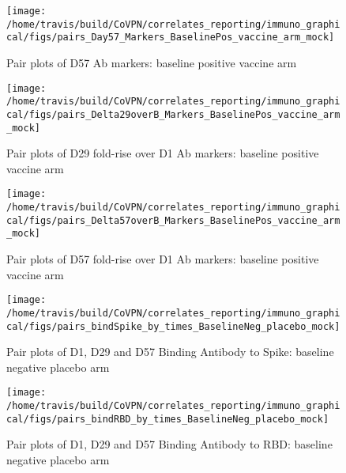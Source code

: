 \documentclass[]{book}
\theoremstyle{definition}
\theoremstyle{definition}
\theoremstyle{definition}
\newcommand{\1}{\mathbbm{1}}
\begin{document}
\clearpage
\begin{figure}[H]

{\centering \texttt{[image: /home/travis/build/CoVPN/correlates\_reporting/immuno\_graphical/figs/pairs\_Day57\_Markers\_BaselinePos\_vaccine\_arm\_mock]} 

}

\caption{Pair plots of D57 Ab markers: baseline positive vaccine arm}\label{fig:unnamed-chunk-14}
\end{figure}

\clearpage
\begin{figure}[H]

{\centering \texttt{[image: /home/travis/build/CoVPN/correlates\_reporting/immuno\_graphical/figs/pairs\_Delta29overB\_Markers\_BaselinePos\_vaccine\_arm\_mock]} 

}

\caption{Pair plots of D29 fold-rise over D1 Ab markers: baseline positive vaccine arm}\label{fig:unnamed-chunk-15}
\end{figure}

\clearpage
\begin{figure}[H]

{\centering \texttt{[image: /home/travis/build/CoVPN/correlates\_reporting/immuno\_graphical/figs/pairs\_Delta57overB\_Markers\_BaselinePos\_vaccine\_arm\_mock]} 

}

\caption{Pair plots of D57 fold-rise over D1 Ab markers: baseline positive vaccine arm}\label{fig:unnamed-chunk-16}
\end{figure}

\clearpage
\begin{figure}[H]

{\centering \texttt{[image: /home/travis/build/CoVPN/correlates\_reporting/immuno\_graphical/figs/pairs\_bindSpike\_by\_times\_BaselineNeg\_placebo\_mock]} 

}

\caption{Pair plots of D1, D29 and D57 Binding Antibody to Spike: baseline negative placebo arm}\label{fig:unnamed-chunk-17}
\end{figure}

\clearpage
\begin{figure}[H]

{\centering \texttt{[image: /home/travis/build/CoVPN/correlates\_reporting/immuno\_graphical/figs/pairs\_bindRBD\_by\_times\_BaselineNeg\_placebo\_mock]} 

}

\caption{Pair plots of D1, D29 and D57 Binding Antibody to RBD: baseline negative placebo arm}\label{fig:unnamed-chunk-18}
\end{figure}
\end{document}
